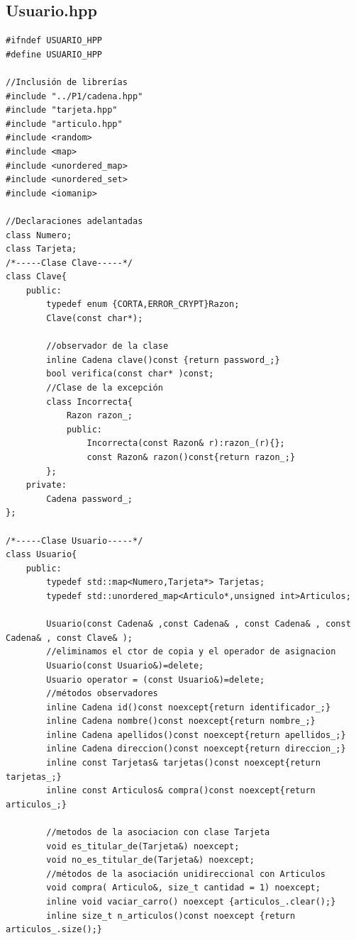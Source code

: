 \subsection{Usuario.hpp}
\begin{verbatim}
#ifndef USUARIO_HPP
#define USUARIO_HPP

//Inclusión de librerías
#include "../P1/cadena.hpp"
#include "tarjeta.hpp"
#include "articulo.hpp"
#include <random>
#include <map>
#include <unordered_map>
#include <unordered_set>
#include <iomanip>

//Declaraciones adelantadas
class Numero;
class Tarjeta;
/*-----Clase Clave-----*/
class Clave{
    public:
        typedef enum {CORTA,ERROR_CRYPT}Razon;
        Clave(const char*);

        //observador de la clase
        inline Cadena clave()const {return password_;}
        bool verifica(const char* )const;
        //Clase de la excepción
        class Incorrecta{
            Razon razon_;
            public:
                Incorrecta(const Razon& r):razon_(r){};
                const Razon& razon()const{return razon_;}
        };
    private:
        Cadena password_;
};

/*-----Clase Usuario-----*/
class Usuario{
    public:
        typedef std::map<Numero,Tarjeta*> Tarjetas;
        typedef std::unordered_map<Articulo*,unsigned int>Articulos;

        Usuario(const Cadena& ,const Cadena& , const Cadena& , const Cadena& , const Clave& );
        //eliminamos el ctor de copia y el operador de asignacion
        Usuario(const Usuario&)=delete;
        Usuario operator = (const Usuario&)=delete;
        //métodos observadores
        inline Cadena id()const noexcept{return identificador_;}
        inline Cadena nombre()const noexcept{return nombre_;}
        inline Cadena apellidos()const noexcept{return apellidos_;}
        inline Cadena direccion()const noexcept{return direccion_;}
        inline const Tarjetas& tarjetas()const noexcept{return tarjetas_;}
        inline const Articulos& compra()const noexcept{return articulos_;}
        
        //metodos de la asociacion con clase Tarjeta
        void es_titular_de(Tarjeta&) noexcept;
        void no_es_titular_de(Tarjeta&) noexcept;
        //métodos de la asociación unidireccional con Articulos
        void compra( Articulo&, size_t cantidad = 1) noexcept;
        inline void vaciar_carro() noexcept {articulos_.clear();}
        inline size_t n_articulos()const noexcept {return articulos_.size();}


\end{verbatim}

